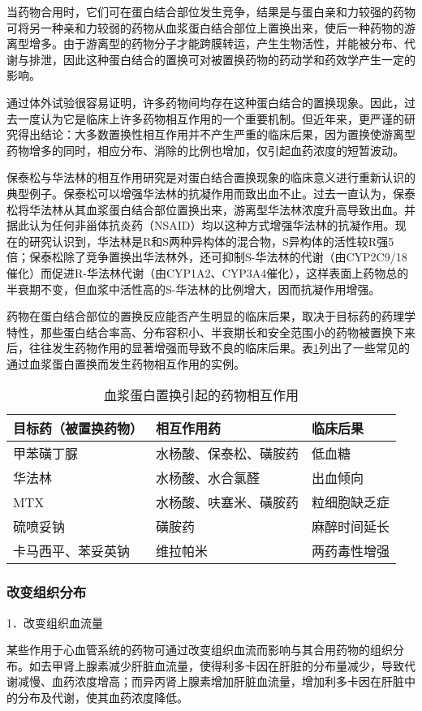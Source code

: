 当药物合用时，它们可在蛋白结合部位发生竞争，结果是与蛋白亲和力较强的药物可将另一种亲和力较弱的药物从血浆蛋白结合部位上置换出来，使后一种药物的游离型增多。由于游离型的药物分子才能跨膜转运，产生生物活性，并能被分布、代谢与排泄，因此这种蛋白结合的置换可对被置换药物的药动学和药效学产生一定的影响。

通过体外试验很容易证明，许多药物间均存在这种蛋白结合的置换现象。因此，过去一度认为它是临床上许多药物相互作用的一个重要机制。但近年来，更严谨的研究得出结论：大多数置换性相互作用并不产生严重的临床后果，因为置换使游离型药物增多的同时，相应分布、消除的比例也增加，仅引起血药浓度的短暂波动。

保泰松与华法林的相互作用研究是对蛋白结合置换现象的临床意义进行重新认识的典型例子。保泰松可以增强华法林的抗凝作用而致出血不止。过去一直认为，保泰松将华法林从其血浆蛋白结合部位置换出来，游离型华法林浓度升高导致出血。并据此认为任何非甾体抗炎药（NSAID）均以这种方式增强华法林的抗凝作用。现在的研究认识到，华法林是R和S两种异构体的混合物，S异构体的活性较R强5倍；保泰松除了竞争置换出华法林外，还可抑制S-华法林的代谢（由CYP2C9/18催化）而促进R-华法林代谢（由CYP1A2、CYP3A4催化），这样表面上药物总的半衰期不变，但血浆中活性高的S-华法林的比例增大，因而抗凝作用增强。

药物在蛋白结合部位的置换反应能否产生明显的临床后果，取决于目标药的药理学特性，那些蛋白结合率高、分布容积小、半衰期长和安全范围小的药物被置换下来后，往往发生药物作用的显著增强而导致不良的临床后果。表\ref{tab4-1}列出了一些常见的通过血浆蛋白置换而发生药物相互作用的实例。

\begin{longtable}[]{@{}lll@{}}
    \caption{血浆蛋白置换引起的药物相互作用}
    \label{tab4-1}\\
    \toprule
目标药（被置换药物） & 相互作用药 & 临床后果\tabularnewline
\midrule
甲苯磺丁脲 & 水杨酸、保泰松、磺胺药 & 低血糖\tabularnewline
华法林 & 水杨酸、水合氯醛 & 出血倾向\tabularnewline
MTX & 水杨酸、呋塞米、磺胺药 & 粒细胞缺乏症\tabularnewline
硫喷妥钠 & 磺胺药 & 麻醉时间延长\tabularnewline
卡马西平、苯妥英钠 & 维拉帕米 & 两药毒性增强\tabularnewline
\bottomrule
\end{longtable}

\subsubsection{改变组织分布}

1．改变组织血流量

某些作用于心血管系统的药物可通过改变组织血流而影响与其合用药物的组织分布。如去甲肾上腺素减少肝脏血流量，使得利多卡因在肝脏的分布量减少，导致代谢减慢、血药浓度增高；而异丙肾上腺素增加肝脏血流量，增加利多卡因在肝脏中的分布及代谢，使其血药浓度降低。

